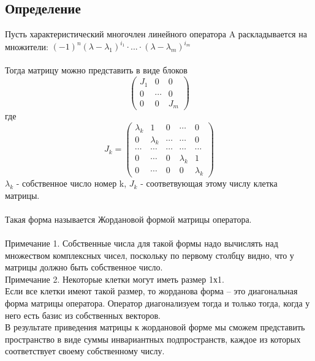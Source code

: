 \documentclass[12pt]{article}
\begin{document}
    \subsection{Определение}

    Пусть характеристический многочлен линейного оператора A раскладывается на множители:
    \((-1)^n(\lambda-\lambda_1)^{i_1}\cdot...\cdot(\lambda-\lambda_m)^{i_m}\)\\\\
    Тогда матрицу можно представить в виде блоков
    \[
        \begin{pmatrix}
            J_1 & 0      & 0   \\
            0   & \cdots & 0   \\
            0   & 0      & J_m
        \end{pmatrix}
    \] где
    \[
        J_k = \begin{pmatrix}
            \lambda_k & 1         & 0      & \cdots    & 0         \\
            0         & \lambda_k & \cdots & \cdots    & 0         \\
            \cdots    & \cdots    & \cdots & \cdots    & \cdots    \\
            0         & \cdots    & 0      & \lambda_k & 1         \\
            0         & \cdots    & 0      & 0         & \lambda_k
        \end{pmatrix}
    \]
    $\lambda_k$ - собственное число номер k, $J_k$ - соответвующая этому числу клетка матрицы.\\\\
    Такая форма называется Жордановой формой матрицы оператора. \\\\
    Примечание 1. Собственные числа для такой формы надо вычислять над множеством комплексных чисел,
    поскольку по первому столбцу видно, что у матрицы должно быть собственное число. \\
    Примечание 2. Некоторые клетки могут иметь размер 1х1.\\
    Если все клетки имеют такой размер, то жорданова форма – это диагональная форма матрицы оператора.
    Оператор диагонализуем тогда и только тогда, когда у него есть базис из собственных векторов.\\
    В результате приведения матрицы к жордановой форме мы сможем представить пространство в виде суммы
    инвариантных подпространств, каждое из которых соответствует своему собственному числу.\\\\
\end{document}
